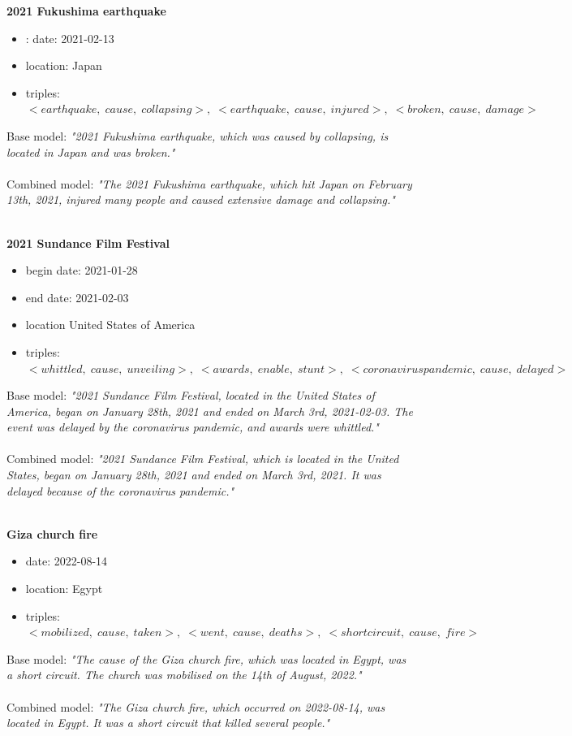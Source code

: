 \documentclass[
hf, %
]{ceurart}
\begin{document}
\textbf{2021 Fukushima earthquake}
\begin{itemize}
    \item: date: 2021-02-13
    \item location: Japan
    \item triples: $<earthquake,\;cause,\;collapsing>,\; <earthquake,\; cause,\; injured>,\; <broken,\; cause,\; damage>$
\end{itemize}
Base model: \textit{"2021 Fukushima earthquake, which was caused by collapsing, is located in Japan and was broken."}\\\\
\noindent
Combined model: \textit{"The 2021 Fukushima earthquake, which hit Japan on February 13th, 2021, injured many people and caused extensive damage and collapsing."}\\\\
\noindent

\textbf{2021 Sundance Film Festival}
\begin{itemize}
    \item begin date: 2021-01-28
    \item end date: 2021-02-03
    \item location United States of America
    \item triples: $<whittled,\;cause,\;unveiling>,\; <awards,\; enable,\; stunt>,\; <coronavirus pandemic,\; cause,\; delayed>$
\end{itemize}
Base model: \textit{"2021 Sundance Film Festival, located in the United States of America, began on January 28th, 2021 and ended on March 3rd, 2021-02-03. The event was delayed by the coronavirus pandemic, and awards were whittled."}\\\\
\noindent
Combined model: \textit{"2021 Sundance Film Festival, which is located in the United States, began on January 28th, 2021 and ended on March 3rd, 2021. It was delayed because of the coronavirus pandemic."}\\\\
\noindent

\textbf{Giza church fire}
\begin{itemize}
    \item date: 2022-08-14
    \item location: Egypt
    \item triples: $<mobilized,\;cause,\;taken>,\; <went,\; cause,\; deaths>,\; <short circuit,\; cause,\; fire>$
\end{itemize}
Base model: \textit{"The cause of the Giza church fire, which was located in Egypt, was a short circuit. The church was mobilised on the 14th of August, 2022."}\\\\
\noindent
Combined model: \textit{"The Giza church fire, which occurred on 2022-08-14, was located in Egypt. It was a short circuit that killed several people."}\\\\
\noindent
\end{document}
